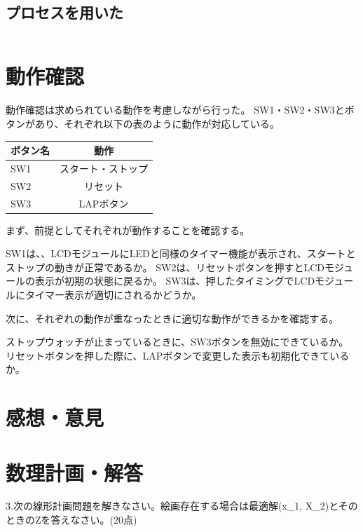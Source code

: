 \documentclass[14pt, oneside]{article}     	%
\begin{document}
\subsection{プロセスを用いた}


\begin{lstlisting}[caption=シンプレクス法プログラム]

\end{lstlisting}


\section{動作確認}
\vspace{5mm}

動作確認は求められている動作を考慮しながら行った。
SW1・SW2・SW3とボタンがあり、それぞれ以下の表のように動作が対応している。
\begin{center}
  \begin{table}[htb]
    \begin{tabular}{|l|c|} \hline
      ボタン名 & 動作 \\ \hline \hline
      SW1 & スタート・ストップ \\ \hline
      SW2 & リセット \\ \hline
      SW3 & LAPボタン \\ \hline
    \end{tabular}
  \end{table}
\end{center}

まず、前提としてそれぞれが動作することを確認する。

SW1は、、LCDモジュールにLEDと同様のタイマー機能が表示され、スタートとストップの動きが正常であるか。
SW2は、リセットボタンを押すとLCDモジュールの表示が初期の状態に戻るか。
SW3は、押したタイミングでLCDモジュールにタイマー表示が適切にされるかどうか。

\vspace{5mm}
次に、それぞれの動作が重なったときに適切な動作ができるかを確認する。

ストップウォッチが止まっているときに、SW3ボタンを無効にできているか。
リセットボタンを押した際に、LAPボタンで変更した表示も初期化できているか。




\section{感想・意見}

\section{数理計画・解答}
3.次の線形計画問題を解きなさい。絵画存在する場合は最適解(x_1, X_2)とそのときのZを答えなさい。(20点)
\end{document}
